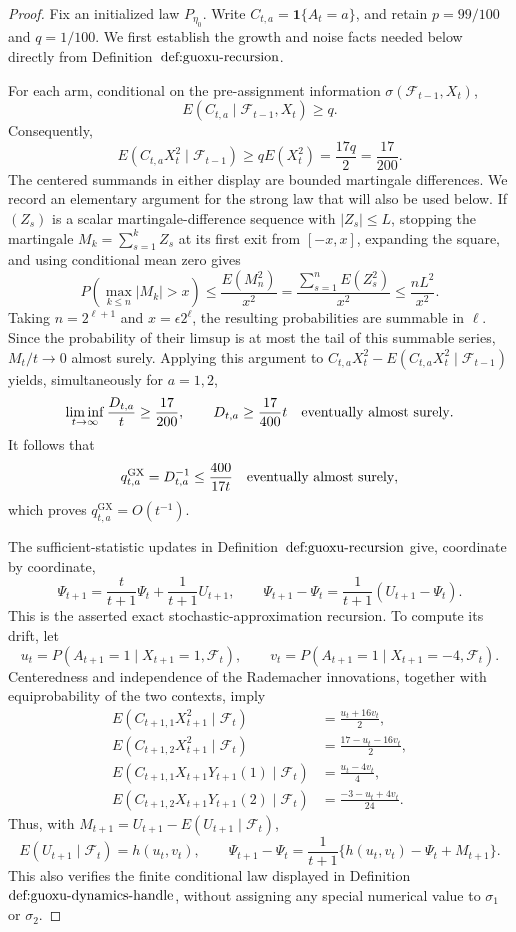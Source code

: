 \documentclass{article}
\begin{document}
\begin{proof}
Fix an initialized law \(P_{\eta _0}\).  Write \(C_{t,a}=\mathbf 1\{A_t=a\}\), and retain \(p=99/100\) and \(q=1/100\).  We first establish the growth and noise facts needed below directly from Definition~\(\textnormal{def:guoxu-recursion}\).

For each arm, conditional on the pre-assignment information \(\sigma(\mathcal F_{t-1},X_t)\),
\[
 E(C_{t,a}\mid\mathcal F_{t-1},X_t)\ge q.
\]
Consequently,
\[
 E(C_{t,a}X_t^2\mid\mathcal F_{t-1})
 \ge qE(X_t^2)=\frac{17q}{2}=\frac{17}{200}.
\]
The centered summands in either display are bounded martingale differences.  We record an elementary argument for the strong law that will also be used below.  If \((Z_s)\) is a scalar martingale-difference sequence with \(|Z_s|\le L\), stopping the martingale \(M_k=\sum_{s=1}^kZ_s\) at its first exit from \([-x,x]\), expanding the square, and using conditional mean zero gives
\[
 P\!\left(\max_{k\le n}|M_k|>x\right)
 \le \frac{E(M_n^2)}{x^2}
 =\frac{\sum_{s=1}^nE(Z_s^2)}{x^2}
 \le \frac{nL^2}{x^2}.
\]
Taking \(n=2^{\ell+1}\) and \(x=\epsilon 2^\ell\), the resulting probabilities are summable in \(\ell\).  Since the probability of their limsup is at most the tail of this summable series, \(M_t/t\to0\) almost surely.  Applying this argument to \(C_{t,a}X_t^2-E(C_{t,a}X_t^2\mid\mathcal F_{t-1})\) yields, simultaneously for \(a=1,2\),
\[
 \liminf_{t\to\infty}\frac{D_{t,a}}t\ge\frac{17}{200},
 \qquad
 D_{t,a}\ge\frac{17}{400}t\quad\hbox{eventually almost surely}.
\]
It follows that
\[
 q^{\mathrm{GX}}_{t,a}=D_{t,a}^{-1}\le\frac{400}{17t}
 \quad\hbox{eventually almost surely},
\]
which proves \(q^{\mathrm{GX}}_{t,a}=O(t^{-1})\).

The sufficient-statistic updates in Definition~\(\textnormal{def:guoxu-recursion}\) give, coordinate by coordinate,
\[
 \Psi_{t+1}
 =\frac{t}{t+1}\Psi_t+\frac1{t+1}U_{t+1},
 \qquad
 \Psi_{t+1}-\Psi_t=\frac1{t+1}(U_{t+1}-\Psi_t).
\]
This is the asserted exact stochastic-approximation recursion.  To compute its drift, let
\[
 u_t=P(A_{t+1}=1\mid X_{t+1}=1,\mathcal F_t),
 \qquad
 v_t=P(A_{t+1}=1\mid X_{t+1}=-4,\mathcal F_t).
\]
Centeredness and independence of the Rademacher innovations, together with equiprobability of the two contexts, imply
\[
 \begin{aligned}
 E(C_{t+1,1}X_{t+1}^2\mid\mathcal F_t)&=\frac{u_t+16v_t}{2},\\
 E(C_{t+1,2}X_{t+1}^2\mid\mathcal F_t)&=\frac{17-u_t-16v_t}{2},\\
 E(C_{t+1,1}X_{t+1}Y_{t+1}(1)\mid\mathcal F_t)&=\frac{u_t-4v_t}{4},\\
 E(C_{t+1,2}X_{t+1}Y_{t+1}(2)\mid\mathcal F_t)&=\frac{-3-u_t+4v_t}{24}.
 \end{aligned}
\]
Thus, with \(M_{t+1}=U_{t+1}-E(U_{t+1}\mid\mathcal F_t)\),
\[
 E(U_{t+1}\mid\mathcal F_t)=h(u_t,v_t),
 \qquad
 \Psi_{t+1}-\Psi_t
 =\frac1{t+1}\{h(u_t,v_t)-\Psi_t+M_{t+1}\}.
\]
This also verifies the finite conditional law displayed in Definition~\(\textnormal{def:guoxu-dynamics-handle}\), without assigning any special numerical value to \(\sigma_1\) or \(\sigma_2\).


\end{proof}
\end{document}

